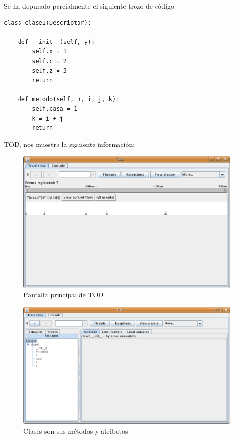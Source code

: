 \documentclass[10pt,a4paper]{article}
\begin{document}
Se ha depurado parcialmente el siguiente trozo de código:\\

\begin{verbatim}
class clase1(Descriptor):
    
    def __init__(self, y):
        self.x = 1
        self.c = 2
        self.z = 3
        return
    
    def metodo(self, h, i, j, k):
        self.casa = 1
        k = i + j
        return
\end{verbatim}

TOD, nos muestra la siguiente información:\\

\begin{figure}[hpb]
	\centering
	\includegraphics[scale=0.5]{images/TOD-1.eps}
	\caption{Pantalla principal de TOD}
\end{figure}

\begin{figure}[hpb]
	\centering
	\includegraphics[scale=0.5]{images/TOD-2.eps}
	\caption{Clases son sus métodos y atributos}
\end{figure}
\end{document}
